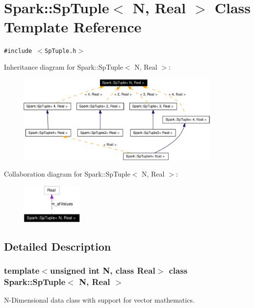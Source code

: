 \section{Spark::Sp\-Tuple$<$ N, Real $>$ Class Template Reference}
\label{classSpark_1_1SpTuple}
{\tt \#include $<$Sp\-Tuple.h$>$}

Inheritance diagram for Spark::Sp\-Tuple$<$ N, Real $>$:\begin{figure}[H]
\begin{center}
\leavevmode
\includegraphics[width=285pt]{classSpark_1_1SpTuple__inherit__graph}
\end{center}
\end{figure}
Collaboration diagram for Spark::Sp\-Tuple$<$ N, Real $>$:\begin{figure}[H]
\begin{center}
\leavevmode
\includegraphics[width=86pt]{classSpark_1_1SpTuple__coll__graph}
\end{center}
\end{figure}


\subsection{Detailed Description}
\subsubsection*{template$<$unsigned int N, class Real$>$ class Spark::Sp\-Tuple$<$ N, Real $>$}

N-Dimensional data class with support for vector mathematics. 

